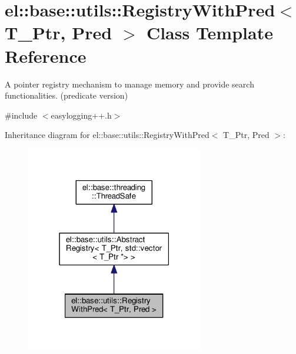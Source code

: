 \hypertarget{classel_1_1base_1_1utils_1_1_registry_with_pred}{}\section{el\+:\+:base\+:\+:utils\+:\+:Registry\+With\+Pred$<$ T\+\_\+\+Ptr, Pred $>$ Class Template Reference}
\label{classel_1_1base_1_1utils_1_1_registry_with_pred}


A pointer registry mechanism to manage memory and provide search functionalities. (predicate version)  




{\ttfamily \#include $<$easylogging++.\+h$>$}



Inheritance diagram for el\+:\+:base\+:\+:utils\+:\+:Registry\+With\+Pred$<$ T\+\_\+\+Ptr, Pred $>$\+:
\nopagebreak
\begin{figure}[H]
\begin{center}
\leavevmode
\includegraphics[width=219pt]{classel_1_1base_1_1utils_1_1_registry_with_pred__inherit__graph}
\end{center}
\end{figure}


